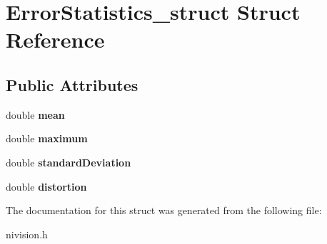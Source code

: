 \hypertarget{structErrorStatistics__struct}{
\section{ErrorStatistics\_\-struct Struct Reference}
\label{structErrorStatistics__struct}
}
\subsection*{Public Attributes}
\begin{DoxyCompactItemize}
\item 
\hypertarget{structErrorStatistics__struct_af45569a675af87775ab14ee497623ca7}{
double {\bfseries mean}}
\label{structErrorStatistics__struct_af45569a675af87775ab14ee497623ca7}

\item 
\hypertarget{structErrorStatistics__struct_aa5adade148059d3fcef58399b5f132e4}{
double {\bfseries maximum}}
\label{structErrorStatistics__struct_aa5adade148059d3fcef58399b5f132e4}

\item 
\hypertarget{structErrorStatistics__struct_aa61744f5085a45849256840325f35482}{
double {\bfseries standardDeviation}}
\label{structErrorStatistics__struct_aa61744f5085a45849256840325f35482}

\item 
\hypertarget{structErrorStatistics__struct_a5c722bc13b8b19e75da704af3027ef1e}{
double {\bfseries distortion}}
\label{structErrorStatistics__struct_a5c722bc13b8b19e75da704af3027ef1e}

\end{DoxyCompactItemize}


The documentation for this struct was generated from the following file:\begin{DoxyCompactItemize}
\item 
nivision.h\end{DoxyCompactItemize}
